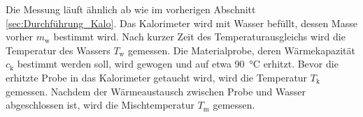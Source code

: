 Die Messung läuft ähnlich ab wie im vorherigen Abschnitt \ref{sec:Durchführung_Kalo}.
Das Kalorimeter wird mit Wasser befüllt, dessen Masse vorher $m_\text{w}$ bestimmt wird.
Nach kurzer Zeit des Temperaturausgleichs wird die Temperatur des Wassers $T_\text{w}$ gemessen.
Die Materialprobe, deren Wärmekapazität $c_\text{k}$ bestimmt werden soll, wird gewogen und auf etwa \SI{90}{\celsius} erhitzt.
Bevor die erhitzte Probe in das Kalorimeter getaucht wird, wird die Temperatur $T_\text{k}$ gemessen.
Nachdem der Wärmeaustausch zwischen Probe und Wasser abgeschlossen ist, wird die Mischtemperatur $T_\text{m}$ gemessen.
